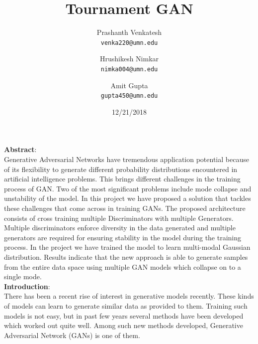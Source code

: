 \documentclass[12pt]{article}
\title{Tournament GAN}
\date{12/21/2018}
\author{
	Prashanth Venkatesh\\
	\texttt{venka220@umn.edu}
	\and
	Hrushikesh Nimkar\\
	\texttt{nimka004@umn.edu}
	\and
	Amit Gupta\\
	\texttt{gupta450@umn.edu}
	\and
}
\begin{document}
\maketitle
\noindent\textbf{Abstract}:\\

Generative Adversarial Networks have tremendous application potential because of its flexibility to generate different probability distributions encountered in artificial intelligence problems. This brings different challenges in the training process of GAN. Two of the most significant problems include mode collapse and unstability of the model. In this project we have proposed a solution that tackles these challenges that come across in training GANs. The proposed architecture consists of cross training multiple Discriminators with multiple Generators. Multiple discriminators enforce diversity in the data generated and multiple generators are required for ensuring stability in the model during the training process. In the project we have trained the model to learn multi-modal Gaussian distribution. Results indicate that the new approach is able to generate samples from the entire data space using multiple GAN models which collapse on to a single mode.\\

\noindent\textbf{Introduction}:\\

There has been a recent rise of interest in generative models recently. These kinds of models can learn to generate similar data as provided to them. Training such models is not easy, but in past few years several methods have been developed which worked out quite well. Among such new methods developed, Generative Adversarial Network (GANs) is one of them.\\
\end{document}
